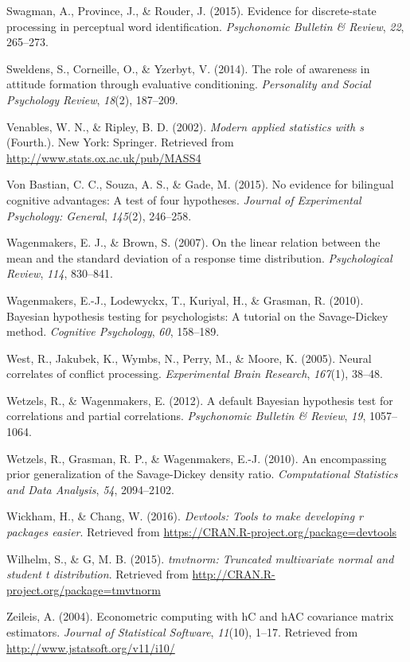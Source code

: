 \documentclass[american,man]{apa6}
\begin{document}
Swagman, A., Province, J., \& Rouder, J. (2015). Evidence for
discrete-state processing in perceptual word identification.
\emph{Psychonomic Bulletin \& Review}, \emph{22}, 265--273.

Sweldens, S., Corneille, O., \& Yzerbyt, V. (2014). The role of
awareness in attitude formation through evaluative conditioning.
\emph{Personality and Social Psychology Review}, \emph{18}(2), 187--209.

Venables, W. N., \& Ripley, B. D. (2002). \emph{Modern applied
statistics with s} (Fourth.). New York: Springer. Retrieved from
\url{http://www.stats.ox.ac.uk/pub/MASS4}

Von Bastian, C. C., Souza, A. S., \& Gade, M. (2015). No evidence for
bilingual cognitive advantages: A test of four hypotheses. \emph{Journal
of Experimental Psychology: General}, \emph{145}(2), 246--258.

Wagenmakers, E. J., \& Brown, S. (2007). On the linear relation between
the mean and the standard deviation of a response time distribution.
\emph{Psychological Review}, \emph{114}, 830--841.

Wagenmakers, E.-J., Lodewyckx, T., Kuriyal, H., \& Grasman, R. (2010).
Bayesian hypothesis testing for psychologists: A tutorial on the
Savage-Dickey method. \emph{Cognitive Psychology}, \emph{60}, 158--189.

West, R., Jakubek, K., Wymbs, N., Perry, M., \& Moore, K. (2005). Neural
correlates of conflict processing. \emph{Experimental Brain Research},
\emph{167}(1), 38--48.

Wetzels, R., \& Wagenmakers, E. (2012). A default Bayesian hypothesis
test for correlations and partial correlations. \emph{Psychonomic
Bulletin \& Review}, \emph{19}, 1057--1064.

Wetzels, R., Grasman, R. P., \& Wagenmakers, E.-J. (2010). An
encompassing prior generalization of the Savage-Dickey density ratio.
\emph{Computational Statistics and Data Analysis}, \emph{54},
2094--2102.

Wickham, H., \& Chang, W. (2016). \emph{Devtools: Tools to make
developing r packages easier}. Retrieved from
\url{https://CRAN.R-project.org/package=devtools}

Wilhelm, S., \& G, M. B. (2015). \emph{tmvtnorm: Truncated multivariate
normal and student t distribution}. Retrieved from
\url{http://CRAN.R-project.org/package=tmvtnorm}

Zeileis, A. (2004). Econometric computing with hC and hAC covariance
matrix estimators. \emph{Journal of Statistical Software},
\emph{11}(10), 1--17. Retrieved from
\url{http://www.jstatsoft.org/v11/i10/}
\end{document}
